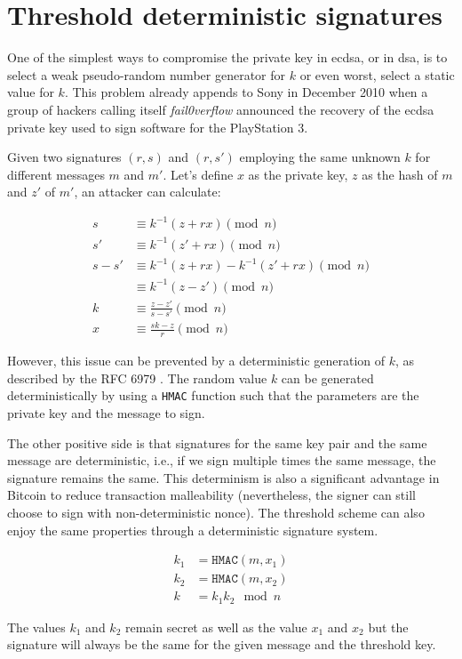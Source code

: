 \section{Threshold deterministic signatures}

One of the simplest ways to compromise the private key in \gls{ecdsa}, or in
\gls{dsa}, is to select a weak pseudo-random number generator for $k$ or even
worst, select a static value for $k$. This problem already appends to Sony in
December 2010 when a group of hackers calling itself \textit{fail0verflow}
announced the recovery of the \gls{ecdsa} private key used to sign software for
the PlayStation 3.

Given two signatures $(r, s)$ and $(r, s')$ employing the same unknown $k$ for
different messages $m$ and $m'$. Let's define $x$ as the private key, $z$ as the
hash of $m$ and $z'$ of $m'$, an attacker can calculate:

\begin{equation*}
\begin{split}
  s &\equiv k^{-1} (z + rx) \pmod n \\
  s' &\equiv k^{-1} (z' + rx) \pmod n \\
  s - s' &\equiv k^{-1} (z + rx) - k^{-1} (z' + rx) \pmod n \\
         &\equiv k^{-1} (z - z') \pmod n \\
  k &\equiv \frac{z - z'}{s - s'} \pmod n \\
  x &\equiv \frac{sk - z}{r} \pmod n
\end{split}
\end{equation*}

However, this issue can be prevented by a deterministic generation of $k$, as
described by the RFC 6979 \cite{rfc6979}. The random value $k$ can be generated
deterministically by using a \texttt{HMAC} function such that the parameters are
the private key and the message to sign.

The other positive side is that signatures for the same key pair and the same
message are deterministic, i.e., if we sign multiple times the same message, the
signature remains the same. This determinism is also a significant advantage in
Bitcoin to reduce transaction malleability (nevertheless, the signer can still
choose to sign with non-deterministic nonce). The threshold scheme can also
enjoy the same properties through a deterministic signature system.

\begin{equation*}
\begin{split}
  k_1 &= \texttt{HMAC}(m, x_1) \\
  k_2 &= \texttt{HMAC}(m, x_2) \\
  k &= k_1k_2 \mod n
\end{split}
\end{equation*}

The values $k_1$ and $k_2$ remain secret as well as the value $x_1$ and $x_2$
but the signature will always be the same for the given message and the
threshold key.
